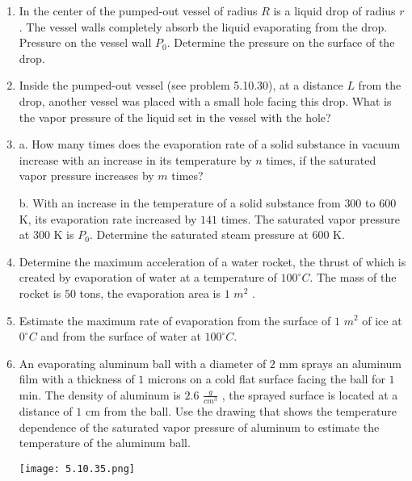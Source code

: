 \documentclass{article}
\begin{document}
\begin{enumerate}[label=5.10.\arabic*]
\item In the center of the pumped-out vessel of radius $R$ is a liquid drop of radius $r$. The vessel walls completely absorb the liquid evaporating from the drop. Pressure on the vessel wall $P_0$. Determine the pressure on the surface of the drop.

\item Inside the pumped-out vessel (see problem 5.10.30), at a distance $L$ from the drop, another vessel was placed with a small hole facing this drop. What is the vapor pressure of the liquid set in the vessel with the hole?

\item a. How many times does the evaporation rate of a solid substance in vacuum increase with an increase in its temperature by $n$ times, if the saturated vapor pressure increases by $m$ times? 

b. With an increase in the temperature of a solid substance from $300$ to $600$ K, its evaporation rate increased by $141$ times. The saturated vapor pressure at $300$ K is $P_0$. Determine the saturated steam pressure at $600$ K.

\item Determine the maximum acceleration of a water rocket, the thrust of which is created by evaporation of water at a temperature of $100^\circ C$. The mass of the rocket is $50$ tons, the evaporation area is $1$ $m^2$ .

\item Estimate the maximum rate of evaporation from the surface of $1$ $m^2$ of ice at $0^\circ C$ and from the surface of water at $100^\circ C$.



\item An evaporating aluminum ball with a diameter of $2$ mm sprays an aluminum film with a thickness of $1$ microns on a cold flat surface facing the ball for $1$ min. The density of aluminum is $2.6$ $\frac{g}{cm^3}$ , the sprayed surface is located at a distance of $1$ cm from the ball. Use the drawing that shows the temperature dependence of the saturated vapor pressure of aluminum to estimate the temperature of the aluminum ball.

\begin{center}
    \texttt{[image: 5.10.35.png]}
\end{center}





\end{enumerate}
\end{document}
